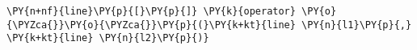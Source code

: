 \begin{Verbatim}[commandchars=\\\{\}]
    \PY{n+nf}{line}\PY{p}{[}\PY{p}{]} \PY{k}{operator} \PY{o}{\PYZca{}}\PY{o}{\PYZca{}}\PY{p}{(}\PY{k+kt}{line} \PY{n}{l1}\PY{p}{,} \PY{k+kt}{line} \PY{n}{l2}\PY{p}{)}
\end{Verbatim}
